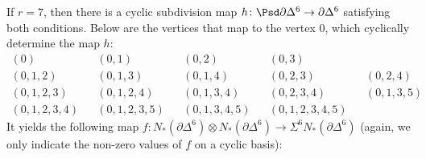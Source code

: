 If $r=7$, then there is a cyclic subdivision map $h\colon \Psd \partial \Delta^6\to \partial \Delta^6$ satisfying both conditions. Below are the vertices that map to the vertex $0$, which cyclically determine the map $h$:
\begin{align*}
			(0) &&
			(0,1) &&
			(0,2) &&
			(0,3) \\
			(0,1,2) &&
			(0,1,3) &&
			(0,1,4) &&
			(0,2,3) &&
			(0,2,4) \\
			(0,1,2,3) &&
			(0,1,2,4) &&
			(0,1,3,4) &&
			(0,2,3,4) &&
			(0,1,3,5) \\
			(0,1,2,3,4) &&
			(0,1,2,3,5) &&
			(0,1,3,4,5) &&
			(0,1,2,3,4,5)
\end{align*}
It yields the following map $f\colon N_*(\partial \Delta^6)\otimes N_*(\partial \Delta^6)\to \Sigma^6N_*(\partial \Delta^6)$ (again, we only indicate the non-zero values of $f$ on a cyclic basis):
